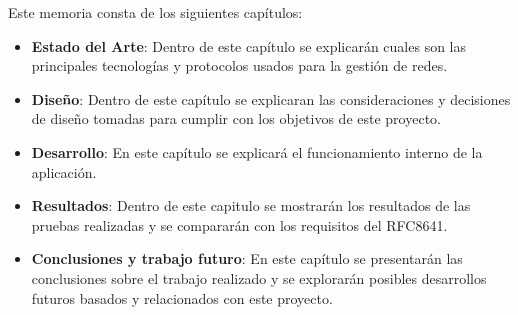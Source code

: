 Este memoria consta de los siguientes capítulos:
\begin{itemize}
    \item\textbf{Estado del Arte}: Dentro de este capítulo se explicarán cuales son las principales tecnologías y protocolos usados para la gestión de redes.
    \item\textbf{Diseño}: Dentro de este capítulo se explicaran las consideraciones y decisiones de diseño tomadas para cumplir con los objetivos de este proyecto.
    \item\textbf{Desarrollo}: En este capítulo se explicará el funcionamiento interno de la aplicación.
    \item\textbf{Resultados}: Dentro de este capitulo se mostrarán los resultados de las pruebas realizadas y se compararán con los requisitos del RFC8641\cite{RFC8641}.
    \item\textbf{Conclusiones y trabajo futuro}: En este capítulo se presentarán las conclusiones sobre el trabajo realizado y se explorarán posibles desarrollos futuros basados y relacionados con este proyecto. 
\end{itemize}
